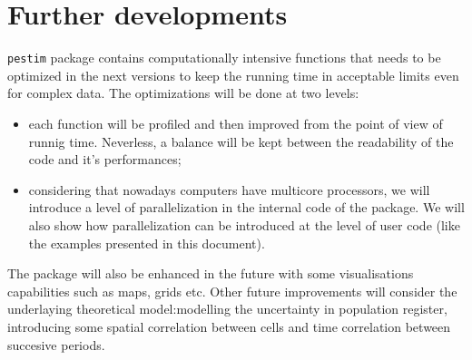 \documentclass[12pt, a4paper]{article}
\begin{document}
\section{Further developments}

\texttt{pestim} package contains computationally intensive functions that needs to be optimized in the next versions
to keep the running time in acceptable limits even for complex data. The optimizations will be done at two levels:
\begin{itemize}
	\item each function will be profiled and then improved from the point of view of runnig time. Neverless, a balance will be kept between the readability of the code and it's performances;
	\item considering that nowadays computers have multicore processors, we will introduce a level of parallelization
	in the internal code of the package. We will also show how parallelization can be introduced at the level of user code (like the examples presented in this document).
\end{itemize}

The package will also be enhanced in the future with some visualisations capabilities such as maps, grids etc.
Other future improvements will consider the underlaying theoretical model:modelling the uncertainty in population register, 
introducing some spatial correlation between cells and time correlation between succesive periods.
\end{document}
